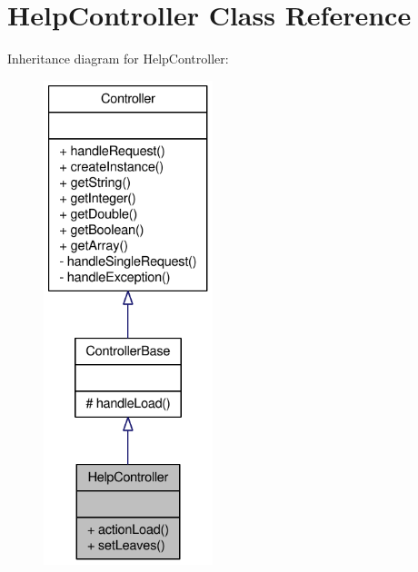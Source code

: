 \hypertarget{classHelpController}{
\section{HelpController Class Reference}
\label{classHelpController}
}


Inheritance diagram for HelpController:\nopagebreak
\begin{figure}[H]
\begin{center}
\leavevmode
\includegraphics[height=400pt]{classHelpController__inherit__graph}
\end{center}
\end{figure}


